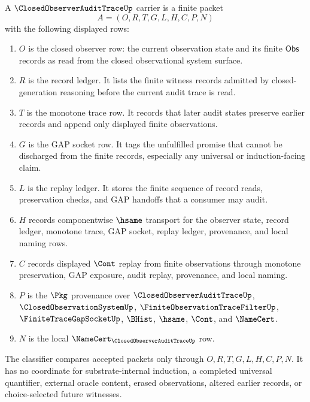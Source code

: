 \begin{definition}
\label{def:closed-observer-audit-trace-carrier}
A $\ClosedObserverAuditTraceUp$ carrier is a finite packet
$$
A=(O,R,T,G,L,H,C,P,N)
$$
with the following displayed rows:
\begin{enumerate}
\item $O$ is the closed observer row: the current observation state and its finite $\mathsf{Obs}$ records as read from the closed observational system surface.
\item $R$ is the record ledger. It lists the finite witness records admitted by closed-generation reasoning before the current audit trace is read.
\item $T$ is the monotone trace row. It records that later audit states preserve earlier records and append only displayed finite observations.
\item $G$ is the GAP socket row. It tags the unfulfilled promise that cannot be discharged from the finite records, especially any universal or induction-facing claim.
\item $L$ is the replay ledger. It stores the finite sequence of record reads, preservation checks, and GAP handoffs that a consumer may audit.
\item $H$ records componentwise $\hsame$ transport for the observer state, record ledger, monotone trace, GAP socket, replay ledger, provenance, and local naming rows.
\item $C$ records displayed $\Cont$ replay from finite observations through monotone preservation, GAP exposure, audit replay, provenance, and local naming.
\item $P$ is the $\Pkg$ provenance over $\ClosedObserverAuditTraceUp$, $\ClosedObservationSystemUp$, $\FiniteObservationTraceFilterUp$, $\FiniteTraceGapSocketUp$, $\BHist$, $\hsame$, $\Cont$, and $\NameCert$.
\item $N$ is the local $\NameCert_{\ClosedObserverAuditTraceUp}$ row.
\end{enumerate}
The classifier compares accepted packets only through $O,R,T,G,L,H,C,P,N$. It has no coordinate for substrate-internal induction, a completed universal quantifier, external oracle content, erased observations, altered earlier records, or choice-selected future witnesses.
\end{definition}

